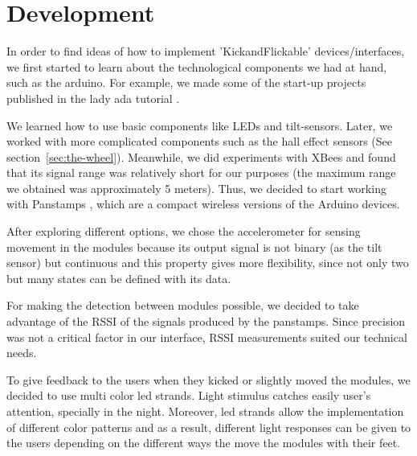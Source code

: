 \section{Development}
In order to find ideas of how to implement 'KickandFlickable' devices/interfaces, we first started to learn about the technological components we had at hand, such as the arduino. For example, we made some of the start-up projects published in the lady ada tutorial \cite{lady_ada_arduino_tutorial}.

We learned how to use basic components like LEDs and tilt-sensors. Later, we worked with more complicated components such as the hall effect sensors (See section~\ref{sec:the-wheel}).
Meanwhile, we did experiments with XBees\cite{xbee} and found that its signal range was relatively short for our purposes (the maximum range we obtained was approximately 5 meters). Thus, we decided to start working with Panstamps \cite{panstamp}, which are a compact wireless versions of the Arduino devices.

After exploring different options, we chose the accelerometer for sensing movement in the modules because its output signal is not binary (as the tilt sensor) but continuous and this property gives more flexibility, since not only two but many states can be defined with its data. 

For making the detection between modules possible, we decided to take advantage of the RSSI of the signals produced by the panstamps. Since precision was not a critical factor in our interface, RSSI measurements suited our technical needs. 

To give feedback to the users when they kicked or slightly moved the modules, we decided to use multi color led strands. Light stimulus catches easily user's attention, specially in the night. Moreover, led strands allow the implementation of different color patterns and as a result, different light responses can be given to the users depending on the different ways the move the modules with their feet. 

